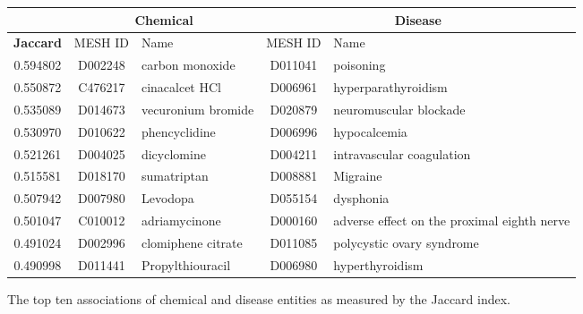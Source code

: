 \documentclass[10pt, oneside]{article}
\begin{document}
\begin{figure}[h]
\begin{center}
\fontsize{9}{11}\selectfont
\begin{tabular}{|*{2}{c|}p{4.5cm}|c|p{4.5cm}|}\hline
 & \multicolumn{2}{c|}{\textbf{Chemical}} & \multicolumn{2}{c|}{\textbf{Disease}} \\ \hline 
 \textbf{Jaccard} & MESH ID   & Name                      & MESH ID   & Name                         \\ \hline
        0.594802 & D002248   & carbon monoxide    & D011041   & poisoning                                   \\ \hline
        0.550872 & C476217   & cinacalcet HCl     & D006961   & hyperparathyroidism                         \\ \hline
        0.535089 & D014673   & vecuronium bromide & D020879   & neuromuscular blockade                      \\ \hline
        0.530970  & D010622   & phencyclidine      & D006996   & hypocalcemia                                \\ \hline
        0.521261 & D004025   & dicyclomine        & D004211   & intravascular coagulation                   \\ \hline
        0.515581 & D018170   & sumatriptan        & D008881   & Migraine                                    \\ \hline
        0.507942 & D007980   & Levodopa           & D055154   & dysphonia                                   \\ \hline
        0.501047 & C010012   & adriamycinone      & D000160   & adverse effect on the proximal eighth nerve \\ \hline
        0.491024 & D002996   & clomiphene citrate & D011085   & polycystic ovary syndrome                   \\ \hline
        0.490998 & D011441   & Propylthiouracil   & D006980   & hyperthyroidism                             \\ \hline
\end{tabular}
\caption{\label{fig:jaccard} The top ten associations of chemical and disease entities as measured by the Jaccard index.}
\end{center}
\end{figure}
\end{document}
